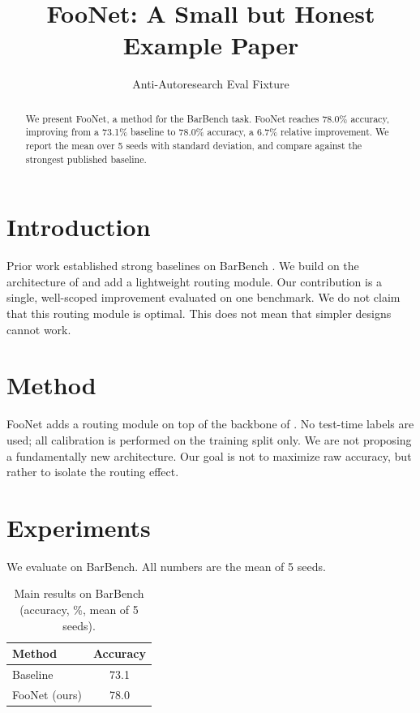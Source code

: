 \documentclass{article}
\title{FooNet: A Small but Honest Example Paper}
\author{Anti-Autoresearch Eval Fixture}
\begin{document}
\maketitle

\begin{abstract}
We present FooNet, a method for the BarBench task. FooNet reaches
78.0\% accuracy, improving from a 73.1\% baseline to 78.0\% accuracy,
a 6.7\% relative improvement. We report the mean over 5 seeds with
standard deviation, and compare against the strongest published baseline.
\end{abstract}

\section{Introduction}
Prior work established strong baselines on BarBench \cite{smith2024bar}.
We build on the architecture of \cite{lee2023foundations} and add a
lightweight routing module. Our contribution is a single, well-scoped
improvement evaluated on one benchmark. We do not claim that this routing module is optimal. This does not mean that simpler designs cannot work.

\section{Method}
FooNet adds a routing module on top of the backbone of
\cite{lee2023foundations}. No test-time labels are used; all calibration
is performed on the training split only. We are not proposing a fundamentally new architecture. Our goal is not to maximize raw accuracy, but rather to isolate the routing effect.

\section{Experiments}
We evaluate on BarBench. All numbers are the mean of 5 seeds.

\begin{table}[t]
\caption{Main results on BarBench (accuracy, \%, mean of 5 seeds).}
\begin{tabular}{lc}
\toprule
Method & Accuracy \\
\midrule
Baseline \cite{smith2024bar} & 73.1 \\
FooNet (ours) & 78.0 \\
\bottomrule
\end{tabular}
\end{table}
\end{document}
